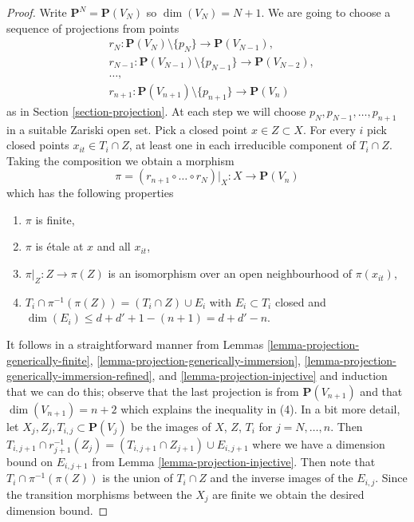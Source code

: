 \documentclass[10pt,a4paper]{amsart}
\theoremstyle{plain}
\theoremstyle{definition}
\theoremstyle{remark}
\numberwithin{equation}{subsection}
\begin{document}
\begin{proof}
Write $\mathbf{P}^N = \mathbf{P}(V_N)$ so $\dim(V_N) = N + 1$.
We are going to choose a sequence of projections from points
\begin{align*}
& r_N : 
\mathbf{P}(V_N) \setminus \{p_N\} \to \mathbf{P}(V_{N - 1}), \\
& r_{N - 1} :
\mathbf{P}(V_{N - 1}) \setminus \{p_{N - 1}\} \to \mathbf{P}(V_{N - 2}), \\
& \ldots,\\
& r_{n + 1} :
\mathbf{P}(V_{n + 1}) \setminus \{p_{n + 1}\} \to \mathbf{P}(V_n)
\end{align*}
as in Section \ref{section-projection}. At each step we will choose
$p_N, p_{N - 1}, \ldots, p_{n + 1}$ in a suitable Zariski open set.
Pick a closed point $x \in Z \subset X$. For every $i$ pick
closed points $x_{it} \in T_i \cap Z$, at least one in each irreducible
component of $T_i \cap Z$. Taking the composition we obtain
a morphism
$$
\pi = (r_{n + 1} \circ \ldots \circ r_N)|_X :
X \longrightarrow \mathbf{P}(V_n)
$$
which has the following properties
\begin{enumerate}
\item $\pi$ is finite,
\item $\pi$ is \'etale at $x$ and all $x_{it}$,
\item $\pi|_Z : Z \to \pi(Z)$ is an isomorphism
over an open neighbourhood of $\pi(x_{it})$,
\item $T_i \cap \pi^{-1}(\pi(Z)) = (T_i \cap Z) \cup E_i$ with
$E_i \subset T_i$ closed and
$\dim(E_i) \leq d + d' + 1 - (n + 1) = d + d' - n$.
\end{enumerate}
It follows in a straightforward manner from
Lemmas \ref{lemma-projection-generically-finite},
\ref{lemma-projection-generically-immersion},
\ref{lemma-projection-generically-immersion-refined}, and
\ref{lemma-projection-injective} and induction that we can do this;
observe that the last projection is from $\mathbf{P}(V_{n + 1})$ and that
$\dim(V_{n + 1}) = n + 2$ which explains the inequality in (4). In a bit
more detail, let $X_j, Z_j, T_{i, j} \subset \mathbf{P}(V_j)$ be the images
of $X$, $Z$, $T_i$ for $j = N, \ldots, n$. Then
$T_{i, j + 1} \cap r_{j + 1}^{-1}(Z_j) = (T_{i, j + 1} \cap Z_{j + 1})
\cup E_{i, j + 1}$ where we have a dimension bound on $E_{i, j + 1}$
from Lemma \ref{lemma-projection-injective}. Then note that
$T_i \cap \pi^{-1}(\pi(Z))$ is the union of $T_i \cap Z$
and the inverse images of the $E_{i, j}$. Since the transition morphisms
between the $X_j$ are finite we obtain the desired dimension bound.


\end{proof}
\end{document}
